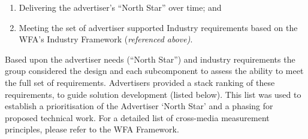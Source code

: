 \documentclass[]{article}
\providecommand{\tightlist}{%
  \setlength{\itemsep}{0pt}\setlength{\parskip}{0pt}}
\begin{document}
\vspace {0.1cm}
\begin{enumerate}
\def\labelenumi{\arabic{enumi}.}
\tightlist
\item
  Delivering the advertiser's ``North Star'' over time; and
\item
  Meeting the set of advertiser supported Industry requirements based on
  the WFA's Industry Framework (\emph{referenced above)}.
\end{enumerate}
\vspace{0.1cm}

Based upon the advertiser needs (``North Star'') and industry requirements the group considered the design and each subcomponent to assess the ability to meet the full set of requirements. Advertisers provided a stack ranking of these requirements, to guide solution development (listed below). This list was used to establish a prioritisation of the Advertiser `North Star' and a phasing for proposed technical work. For a detailed list of cross-media measurement principles, please refer to the WFA Framework.


\setlength{\tabcolsep}{5pt}
\renewcommand{\arraystretch}{1.8}
\end{document}
